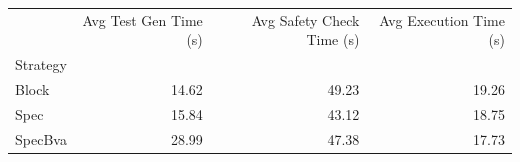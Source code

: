 \begin{tabular}{lrrr}
\toprule
 & Avg Test Gen Time (s) & Avg Safety Check Time (s) & Avg Execution Time (s) \\
Strategy &  &  &  \\
\midrule
Block & 14.62 & 49.23 & 19.26 \\
Spec & 15.84 & 43.12 & 18.75 \\
SpecBva & 28.99 & 47.38 & 17.73 \\
\bottomrule
\end{tabular}
